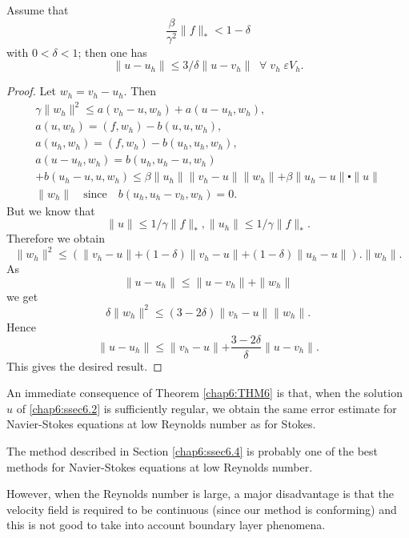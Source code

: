 \begin{THM}\label{chap6:THM6}
Assume that 
$$
\frac{\beta}{\gamma^2}\parallel f\parallel_* < 1-\delta
$$
with $0<\delta < 1$; then one has 
$$ 
\parallel u-u_h\parallel \leq 3/\delta\parallel u-v_h\parallel
\; \; \forall \; v_h\;\varepsilon V_h.
$$
\end{THM}

\begin{proof}
Let $w_h=v_h-u_h$. Then 
\begin{gather*}
\gamma\parallel w_h\parallel^2\leq a(v_h-u,w_h)+a(u-u_h,w_h),\\
a(u,w_h)=(f,w_h)-b(u,u,w_h),\\
a(u_h,w_h)=(f,w_h)-b(u_h,u_h,w_h),\\
a(u-u_h,w_h)=b(u_h,u_h-u,w_h)\\
+b(u_h-u,u,w_h)\leq\beta\parallel
u_h\parallel \parallel v_h-u\parallel \parallel w_h\parallel +
\beta\parallel u_h-u\parallel \centerdot \parallel u\parallel\\
\parallel
 w_h\parallel\quad\text{since}\quad b(u_h,u_h-v_h,w_h)=0.
\end{gather*}
But we know that 
$$
\parallel u\parallel\leq 1/\gamma\parallel f\parallel_*,\parallel
u_h\parallel \leq 1/\gamma\parallel f\parallel_*.
$$\pageoriginale
Therefore we obtain
$$
\parallel w_h\parallel^2 \leq\left(\parallel v_h-u\parallel
+(1-\delta)\parallel v_h-u\parallel +(1-\delta)\parallel
u_h-u\parallel\right).\parallel w_h\parallel.
$$
As 
$$
\parallel u-u_h\parallel\leq\parallel u-v_h\parallel +\parallel
w_h\parallel 
$$
we get
$$
\delta\parallel w_h\parallel^2\leq(3-2\delta)\parallel v_h-u\parallel
\parallel w_h\parallel.
$$
Hence
$$
\parallel u-u_h\parallel\leq\parallel v_h-u\parallel +\frac{3-2\delta}
{\delta}\parallel u-v_h\parallel.
$$
This gives the desired result.
\end{proof}

An immediate consequence of Theorem \ref{chap6:THM6} is that, when the
solution $u$ of \eqref{chap6:ssec6.2} is sufficiently regular, we
obtain the same error estimate for Navier-Stokes equations at low
Reynolds number as for Stokes.

The method described in Section \ref{chap6:ssec6.4} is probably one of
the best methods for Navier-Stokes equations at low Reynolds number.

However, when the Reynolds number is large, a major disadvantage is
that the velocity field is required to be continuous (since our method
is conforming) and this is not good to take into account boundary
layer phenomena.

